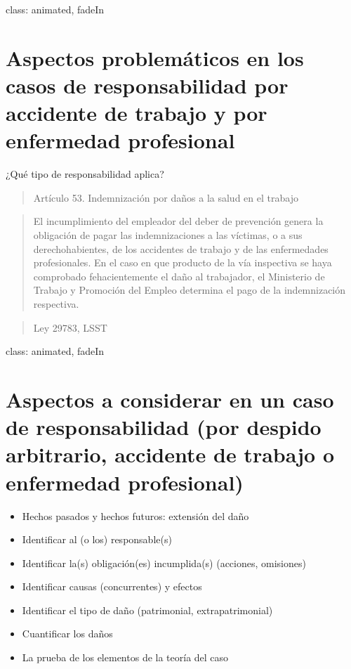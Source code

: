 \documentclass[
]{article}
\begin{document}
class: animated, fadeIn

\section{Aspectos problemáticos en los casos de responsabilidad por
accidente de trabajo y por enfermedad profesional}

¿Qué tipo de responsabilidad aplica?

\begin{quote}
Artículo 53. Indemnización por daños a la salud en el trabajo
\end{quote}

\begin{quote}
El incumplimiento del empleador del deber de prevención genera la
obligación de pagar las indemnizaciones a las víctimas, o a sus
derechohabientes, de los accidentes de trabajo y de las enfermedades
profesionales. En el caso en que producto de la vía inspectiva se haya
comprobado fehacientemente el daño al trabajador, el Ministerio de
Trabajo y Promoción del Empleo determina el pago de la indemnización
respectiva.
\end{quote}

\begin{quote}
Ley 29783, LSST
\end{quote}

class: animated, fadeIn

\section{Aspectos a considerar en un caso de responsabilidad (por
despido arbitrario, accidente de trabajo o enfermedad profesional)}

\begin{itemize}
\item
  Hechos pasados y hechos futuros: extensión del daño
\item
  Identificar al (o los) responsable(s)
\item
  Identificar la(s) obligación(es) incumplida(s) (acciones, omisiones)
\item
  Identificar causas (concurrentes) y efectos
\item
  Identificar el tipo de daño (patrimonial, extrapatrimonial)
\item
  Cuantificar los daños
\item
  La prueba de los elementos de la teoría del caso
\end{itemize}
\end{document}
